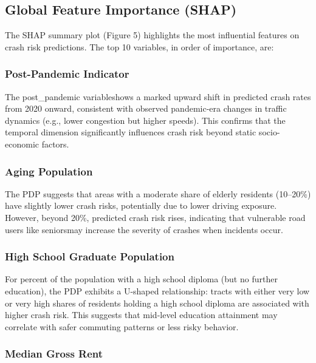 \documentclass[
  number,
  review,
  3p]{elsarticle}
\begin{document}
\subsection{\texorpdfstring{\textbf{Global Feature Importance
(SHAP)}}{Global Feature Importance (SHAP)}}\label{global-feature-importance-shap}

The SHAP summary plot (Figure 5) highlights the most influential
features on crash risk predictions. The top 10 variables, in order of
importance, are:

\subsubsection{Post-Pandemic Indicator}\label{post-pandemic-indicator}

The post\_pandemic variableshows a marked upward shift in predicted
crash rates from 2020 onward, consistent with observed pandemic-era
changes in traffic dynamics (e.g., lower congestion but higher speeds).
This confirms that the temporal dimension significantly influences crash
risk beyond static socio-economic factors.

\subsubsection{Aging Population}\label{aging-population}

The PDP suggests that areas with a moderate share of elderly residents
(10--20\%) have slightly lower crash risks, potentially due to lower
driving exposure. However, beyond 20\%, predicted crash risk rises,
indicating that vulnerable road users like seniorsmay increase the
severity of crashes when incidents occur.

\subsubsection{High School Graduate
Population}\label{high-school-graduate-population}

For percent of the population with a high school diploma (but no further
education), the PDP exhibits a U-shaped relationship: tracts with either
very low or very high shares of residents holding a high school diploma
are associated with higher crash risk. This suggests that mid-level
education attainment may correlate with safer commuting patterns or less
risky behavior.

\subsubsection{Median Gross Rent}\label{median-gross-rent}
\end{document}
